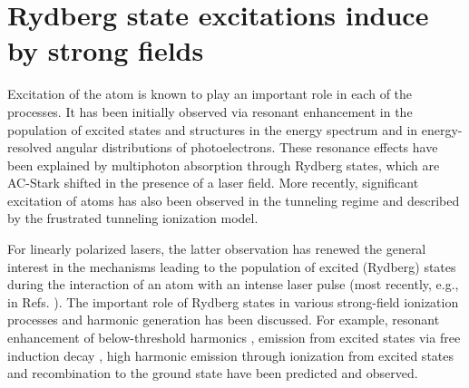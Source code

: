 \section{Rydberg state excitations induce by strong fields} %
\label{sec:rydberg_state_excitations_induce_by_strong_fields}
Excitation of the atom is known to play an important role in each of the processes. It has been initially observed via resonant enhancement in the population of excited states \cite{deboer1992,jones1992} and structures in the energy spectrum \cite{freeman1987,perry1989,agostini1989} and in energy-resolved angular distributions \cite{rottke1994} of photoelectrons. These resonance effects have been explained by multiphoton absorption through Rydberg states, which are AC-Stark shifted in the presence of a laser field. More recently, significant excitation of atoms has also been observed in the tunneling regime and described by the frustrated tunneling ionization model. 

For linearly polarized lasers, the latter observation has renewed the general interest in the mechanisms leading to the population of excited (Rydberg) states during the interaction of an atom with an intense laser pulse (most recently, e.g., in Refs. \cite{chini2014,li2014,li2014b,zimmermann2015,shao2015,camp2015,li2015,fechner2015,bredtmann2016,fushitani2016,lv2016,serebryannikov2016,hart2016,li2016,xiong2016,beaulieu2016,larimian2016,zimmermann2017,bengtsson2017,gao2017,ivanov2017,ilchen2017,mancuso2017,xiong2017,piraux2017}). The important role of Rydberg states in various strong-field ionization processes and harmonic generation has been discussed. For example, resonant enhancement of below-threshold harmonics \cite{toma1999,chini2014,camp2015}, emission from excited states via free induction decay \cite{camp2015,beaulieu2016}, high harmonic emission through ionization from excited states and recombination to the ground state \cite{bian2010,beaulieu2016} have been predicted and observed.

